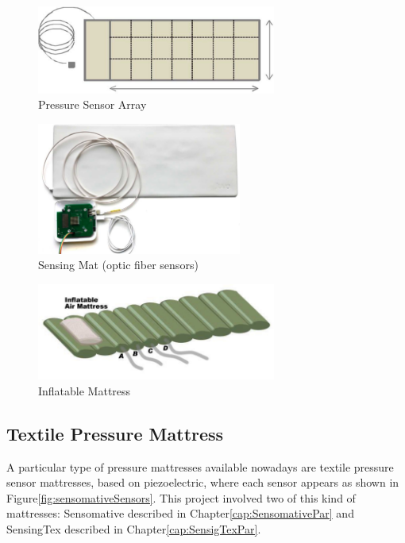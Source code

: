 \begin{figure}[h]
    \centering
    \includegraphics[width=0.7\textwidth]{img/pressure_array.pdf}
    \caption{Pressure Sensor Array}
    \label{fig:sensorArray}
    
\end{figure}
\begin{figure}[h]
   \centering
    \includegraphics[width=0.6\textwidth]{img/sadek_fig.pdf}
    \caption{Sensing Mat (optic fiber sensors)}
    \label{fig:sadek}
\end{figure}
\begin{figure}[h]
    \centering
     \includegraphics[width=0.7\textwidth]{img/arimat.pdf}
     \caption{Inflatable Mattress}
     \label{fig:airmat}
 \end{figure}


\subsection{Textile Pressure Mattress} \label{cap:textile}
A particular type of pressure mattresses available nowadays are textile pressure sensor mattresses, based on piezoelectric, where each sensor appears as shown in Figure\ref{fig:sensomativeSensors}. This project involved two of this kind of mattresses: Sensomative\cite{sensomativeUrl} described in Chapter\ref{cap:SensomativePar} and SensingTex\cite{SensingConnectivity} described in Chapter\ref{cap:SensigTexPar}.


